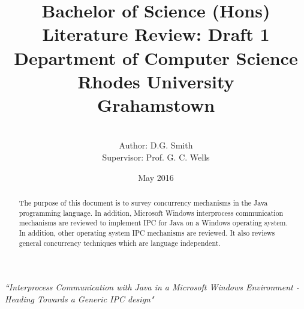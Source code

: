 \documentclass[12pt,a4paper,oneside]{article}
\begin{document}

\title{Bachelor of Science (Hons)
\\Literature Review: Draft 1\\
Department of Computer Science\\Rhodes University\\Grahamstown
}
\author{ 
\\Author: D.G. Smith
\\Supervisor: Prof. G. C. Wells }
\date {May 2016}
\maketitle
\begin{center}
\it{``Interprocess Communication with Java in a Microsoft Windows Environment - Heading Towards a Generic IPC design"}
\end{center}
\begin{abstract}
The purpose of this document is to survey concurrency mechanisms in the Java programming language. In addition, Microsoft Windows interprocess communication mechanisms are reviewed to implement IPC for Java on a Windows operating system. In addition, other operating system IPC mechanisms are reviewed. It also reviews general concurrency techniques which are language independent.
\end{abstract}
\pagebreak
\tableofcontents
\pagebreak
\end{document}
